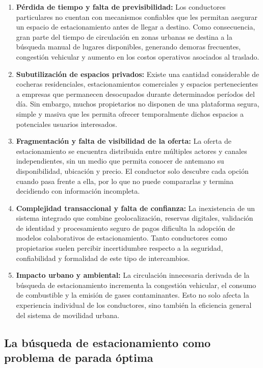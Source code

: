 \begin{enumerate}
\item \textbf{Pérdida de tiempo y falta de previsibilidad:} Los conductores particulares no cuentan con mecanismos confiables que les permitan asegurar un espacio de estacionamiento antes de llegar a destino. Como consecuencia, gran parte del tiempo de circulación en zonas urbanas se destina a la búsqueda manual de lugares disponibles, generando demoras frecuentes, congestión vehicular y aumento en los costos operativos asociados al traslado.

\item \textbf{Subutilización de espacios privados:} Existe una cantidad considerable de cocheras residenciales, estacionamientos comerciales y espacios pertenecientes a empresas que permanecen desocupados durante determinados períodos del día. Sin embargo, muchos propietarios no disponen de una plataforma segura, simple y masiva que les permita ofrecer temporalmente dichos espacios a potenciales usuarios interesados.

\item \textbf{Fragmentación y falta de visibilidad de la oferta:} La oferta de estacionamiento se encuentra distribuida entre múltiples actores y canales independientes, sin un medio que permita conocer de antemano su disponibilidad, ubicación y precio. El conductor solo descubre cada opción cuando pasa frente a ella, por lo que no puede compararlas y termina decidiendo con información incompleta.

\item \textbf{Complejidad transaccional y falta de confianza:} La inexistencia de un sistema integrado que combine geolocalización, reservas digitales, validación de identidad y procesamiento seguro de pagos dificulta la adopción de modelos colaborativos de estacionamiento. Tanto conductores como propietarios suelen percibir incertidumbre respecto a la seguridad, confiabilidad y formalidad de este tipo de intercambios.

\item \textbf{Impacto urbano y ambiental:} La circulación innecesaria derivada de la búsqueda de estacionamiento incrementa la congestión vehicular, el consumo de combustible y la emisión de gases contaminantes. Esto no solo afecta la experiencia individual de los conductores, sino también la eficiencia general del sistema de movilidad urbana.
\end{enumerate}

\subsection{La búsqueda de estacionamiento como problema de parada óptima}

